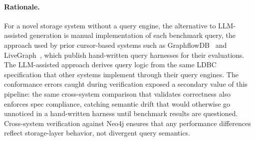 \paragraph{Rationale.}
For a novel storage system without a query engine, the alternative to LLM-assisted generation is manual implementation of each benchmark query, the approach used by prior cursor-based systems such as GraphflowDB~\cite{graphflowdb2021Gupta} and LiveGraph~\cite{zhu2019livegraph}, which publish hand-written query harnesses for their evaluations.
The LLM-assisted approach derives query logic from the same LDBC specification that other systems implement through their query engines.
The conformance errors caught during verification exposed a secondary value of this pipeline: the same cross-system comparison that validates correctness also enforces spec compliance, catching semantic drift that would otherwise go unnoticed in a hand-written harness until benchmark results are questioned.
Cross-system verification against Neo4j ensures that any performance differences reflect storage-layer behavior, not divergent query semantics.
